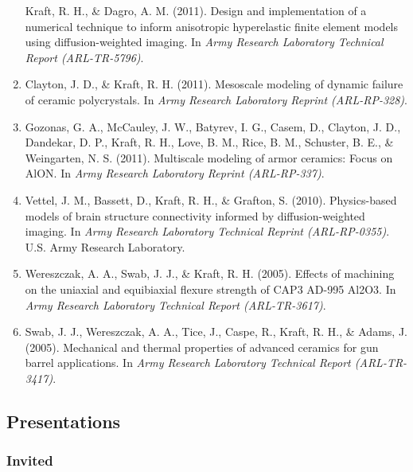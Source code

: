 \documentclass[
]{article}
\begin{document}
\begin{enumerate}
  Kraft, R. H., \& Dagro, A. M. (2011). Design and implementation of a
  numerical technique to inform anisotropic hyperelastic finite element
  models using diffusion-weighted imaging. In \emph{Army Research
  Laboratory Technical Report (ARL-TR-5796)}.
\item
  Clayton, J. D., \& Kraft, R. H. (2011). Mesoscale modeling of dynamic
  failure of ceramic polycrystals. In \emph{Army Research Laboratory
  Reprint (ARL-RP-328)}.
\item
  Gozonas, G. A., McCauley, J. W., Batyrev, I. G., Casem, D., Clayton,
  J. D., Dandekar, D. P., Kraft, R. H., Love, B. M., Rice, B. M.,
  Schuster, B. E., \& Weingarten, N. S. (2011). Multiscale modeling of
  armor ceramics: Focus on AlON. In \emph{Army Research Laboratory
  Reprint (ARL-RP-337)}.
\item
  Vettel, J. M., Bassett, D., Kraft, R. H., \& Grafton, S. (2010).
  Physics-based models of brain structure connectivity informed by
  diffusion-weighted imaging. In \emph{Army Research Laboratory
  Technical Reprint (ARL-RP-0355)}. U.S. Army Research Laboratory.
\item
  Wereszczak, A. A., Swab, J. J., \& Kraft, R. H. (2005). Effects of
  machining on the uniaxial and equibiaxial flexure strength of CAP3
  AD-995 Al2O3. In \emph{Army Research Laboratory Technical Report
  (ARL-TR-3617)}.
\item
  Swab, J. J., Wereszczak, A. A., Tice, J., Caspe, R., Kraft, R. H., \&
  Adams, J. (2005). Mechanical and thermal properties of advanced
  ceramics for gun barrel applications. In \emph{Army Research
  Laboratory Technical Report (ARL-TR-3417)}.
\end{enumerate}

\subsection{Presentations}\label{presentations}

\subsubsection{Invited}\label{invited}
\end{document}
